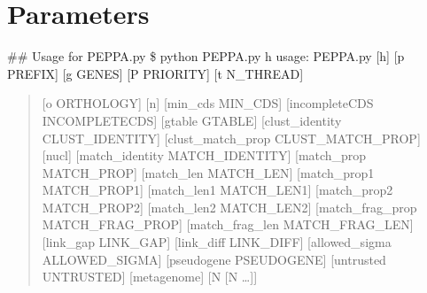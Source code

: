 \documentclass[letterpaper,10pt,english]{sphinxmanual}
\begin{document}
\chapter{Parameters}
\label{\detokenize{usage/parameters:parameters}}\label{\detokenize{usage/parameters::doc}}
\#\# Usage for PEPPA.py
{\color{red}\bfseries{}\textasciigrave{}\textasciigrave{}}\textasciigrave{}
\$ python PEPPA.py \sphinxhyphen{}h
usage: PEPPA.py {[}\sphinxhyphen{}h{]} {[}\sphinxhyphen{}p PREFIX{]} {[}\sphinxhyphen{}g GENES{]} {[}\sphinxhyphen{}P PRIORITY{]} {[}\sphinxhyphen{}t N\_THREAD{]}
\begin{quote}

{[}\sphinxhyphen{}o ORTHOLOGY{]} {[}\sphinxhyphen{}n{]} {[}\textendash{}min\_cds MIN\_CDS{]}
{[}\textendash{}incompleteCDS INCOMPLETECDS{]} {[}\textendash{}gtable GTABLE{]}
{[}\textendash{}clust\_identity CLUST\_IDENTITY{]}
{[}\textendash{}clust\_match\_prop CLUST\_MATCH\_PROP{]} {[}\textendash{}nucl{]}
{[}\textendash{}match\_identity MATCH\_IDENTITY{]} {[}\textendash{}match\_prop MATCH\_PROP{]}
{[}\textendash{}match\_len MATCH\_LEN{]} {[}\textendash{}match\_prop1 MATCH\_PROP1{]}
{[}\textendash{}match\_len1 MATCH\_LEN1{]} {[}\textendash{}match\_prop2 MATCH\_PROP2{]}
{[}\textendash{}match\_len2 MATCH\_LEN2{]} {[}\textendash{}match\_frag\_prop MATCH\_FRAG\_PROP{]}
{[}\textendash{}match\_frag\_len MATCH\_FRAG\_LEN{]} {[}\textendash{}link\_gap LINK\_GAP{]}
{[}\textendash{}link\_diff LINK\_DIFF{]} {[}\textendash{}allowed\_sigma ALLOWED\_SIGMA{]}
{[}\textendash{}pseudogene PSEUDOGENE{]} {[}\textendash{}untrusted UNTRUSTED{]}
{[}\textendash{}metagenome{]}
{[}N {[}N …{]}{]}
\end{quote}
\end{document}
